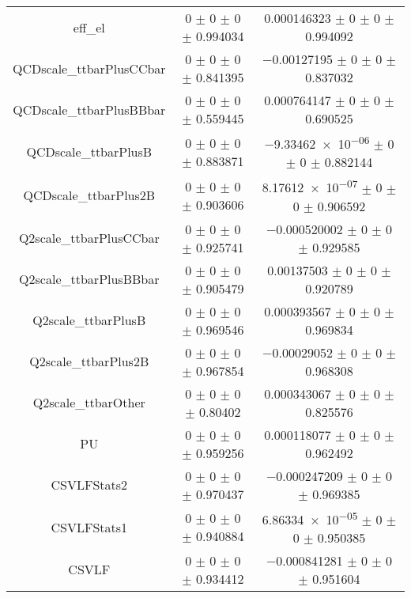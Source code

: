 \begin{table}
\begin{tabular}{ccc}
eff\_el & \num{0} $\pm$ \num{0} $\pm$ \num{0} $\pm$ \num{0.994034} & \num{0.000146323} $\pm$ \num{0} $\pm$ \num{0} $\pm$ \num{0.994092}\\
QCDscale\_ttbarPlusCCbar & \num{0} $\pm$ \num{0} $\pm$ \num{0} $\pm$ \num{0.841395} & \num{-0.00127195} $\pm$ \num{0} $\pm$ \num{0} $\pm$ \num{0.837032}\\
QCDscale\_ttbarPlusBBbar & \num{0} $\pm$ \num{0} $\pm$ \num{0} $\pm$ \num{0.559445} & \num{0.000764147} $\pm$ \num{0} $\pm$ \num{0} $\pm$ \num{0.690525}\\
QCDscale\_ttbarPlusB & \num{0} $\pm$ \num{0} $\pm$ \num{0} $\pm$ \num{0.883871} & \num{-9.33462e-06} $\pm$ \num{0} $\pm$ \num{0} $\pm$ \num{0.882144}\\
QCDscale\_ttbarPlus2B & \num{0} $\pm$ \num{0} $\pm$ \num{0} $\pm$ \num{0.903606} & \num{8.17612e-07} $\pm$ \num{0} $\pm$ \num{0} $\pm$ \num{0.906592}\\
Q2scale\_ttbarPlusCCbar & \num{0} $\pm$ \num{0} $\pm$ \num{0} $\pm$ \num{0.925741} & \num{-0.000520002} $\pm$ \num{0} $\pm$ \num{0} $\pm$ \num{0.929585}\\
Q2scale\_ttbarPlusBBbar & \num{0} $\pm$ \num{0} $\pm$ \num{0} $\pm$ \num{0.905479} & \num{0.00137503} $\pm$ \num{0} $\pm$ \num{0} $\pm$ \num{0.920789}\\
Q2scale\_ttbarPlusB & \num{0} $\pm$ \num{0} $\pm$ \num{0} $\pm$ \num{0.969546} & \num{0.000393567} $\pm$ \num{0} $\pm$ \num{0} $\pm$ \num{0.969834}\\
Q2scale\_ttbarPlus2B & \num{0} $\pm$ \num{0} $\pm$ \num{0} $\pm$ \num{0.967854} & \num{-0.00029052} $\pm$ \num{0} $\pm$ \num{0} $\pm$ \num{0.968308}\\
Q2scale\_ttbarOther & \num{0} $\pm$ \num{0} $\pm$ \num{0} $\pm$ \num{0.80402} & \num{0.000343067} $\pm$ \num{0} $\pm$ \num{0} $\pm$ \num{0.825576}\\
PU & \num{0} $\pm$ \num{0} $\pm$ \num{0} $\pm$ \num{0.959256} & \num{0.000118077} $\pm$ \num{0} $\pm$ \num{0} $\pm$ \num{0.962492}\\
CSVLFStats2 & \num{0} $\pm$ \num{0} $\pm$ \num{0} $\pm$ \num{0.970437} & \num{-0.000247209} $\pm$ \num{0} $\pm$ \num{0} $\pm$ \num{0.969385}\\
CSVLFStats1 & \num{0} $\pm$ \num{0} $\pm$ \num{0} $\pm$ \num{0.940884} & \num{6.86334e-05} $\pm$ \num{0} $\pm$ \num{0} $\pm$ \num{0.950385}\\
CSVLF & \num{0} $\pm$ \num{0} $\pm$ \num{0} $\pm$ \num{0.934412} & \num{-0.000841281} $\pm$ \num{0} $\pm$ \num{0} $\pm$ \num{0.951604}\\

\end{tabular}
\end{table}
